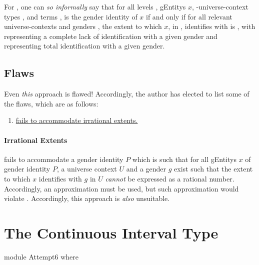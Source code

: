 \documentclass{article}
\theoremstyle{remark}
\begin{document}
For , one can \emph{so informally} say that for all levels , \glspl{gEntity} \(x\), -universe-context types , and   terms ,  is the gender identity of \(x\) if and only if for all relevant universe-contexts  and genders , the extent to which \(x\), in , identifies with  is   , with  representing a complete lack of identification with a given gender and  representing total identification with a given gender.

\subsection{Flaws}\label{sec:gender5flaws}
Even \emph{this} approach is flawed!  Accordingly, the author has elected to list some of the flaws, which are as follows:

\begin{enumerate}
  \item \hyperref[sec:gender5irrational]{ fails to accommodate irrational extents.}\label{enum:gender5flawsIrrational}
\end{enumerate}

\paragraph{Irrational Extents}\label{sec:gender5irrational}
 fails to accommodate a gender identity \(P\) which is such that for all \glspl{gEntity} \(x\) of gender identity \(P\), a universe context \(U\) and a gender \(g\) exist such that the extent to which \(x\) identifies with \(g\) in \(U\) \emph{cannot} be expressed as a rational number.  Accordingly, an approximation must be used, but such approximation would violate .  Accordingly, this approach is \emph{also} unsuitable.

\section{The Continuous Interval Type}\label{sec:gender6}

\begin{code}
module Attempt6 where
\end{code}
\end{document}
